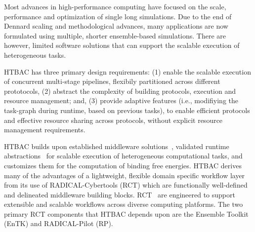
Most advances in high-performance computing have focused on the scale,
performance and optimization of single long simulations. Due to the end of
Dennard scaling and methodological advances, many applications are now
formulated using multiple, shorter ensemble-based simulations. There are
however, limited software solutions that can support the scalable execution of
heterogeneous tasks.


HTBAC has three primary design requirements\@: (1) enable the scalable
execution of concurrent multi-stage pipelines, flexibily partitioned across
different prototocols, (2) abstract the complexity of building protocols,
execution and resource management; and, (3) provide adaptive features (i.e.,
modifiying the task-graph during runtime, based on previous tasks), to enable
efficient protocols and effective resource sharing across protocols, without
explicit resource management requirements.




HTBAC builds upon established middleware solutions~\cite{review_bb_2016},
validated runtime abstractions~\cite{turilli2017comprehensive} for scalable
execution of heterogeneous computational tasks, and customizes them for the
computation of binding free energies. HTBAC derives many of the advantages of
a lightweight, flexible domain specific workflow layer from its use of
RADICAL-Cybertools (RCT) which are functionally well-defined and delineated
middleware building blocks. RCT~\cite{review_bb_2016} are engineered to
support extensible and scalable workflows across diverse computing platforms.
The two primary RCT components that HTBAC depends upon are the Ensemble
Toolkit (EnTK) and RADICAL-Pilot (RP).


